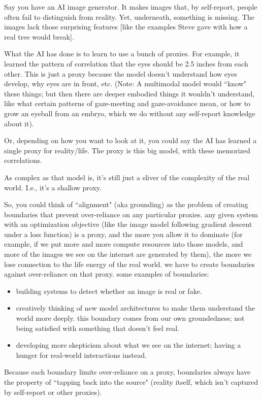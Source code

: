Say you have an AI image generator. It makes images that, by self-report, people often fail to distinguish from reality. Yet, underneath, something is missing. The images lack those surprising features [like the examples Steve gave with how a real tree would break]. 

What the AI has done is to learn to use a bunch of proxies. For example, it learned the pattern of correlation that the eyes should be 2.5 inches from each other. This is just a proxy because the model doesn't understand how eyes develop, why eyes are in front, etc. (Note: A multimodal model would ``know" these things; but then there are deeper embodied things it wouldn't understand, like what certain patterns of gaze-meeting and gaze-avoidance mean, or how to grow an eyeball from an embryo, which we do without any self-report knowledge about it). 

Or, depending on how you want to look at it, you could say the AI has learned a single proxy for reality/life. The proxy is this big model, with these memorized correlations. 

As complex as that model is, it's still just a sliver of the complexity of the real world. I.e., it's a shallow proxy. 

So, you could think of ``alignment" (aka grounding) as the problem of creating boundaries that prevent over-reliance on any particular proxies. any given system with an optimization objective (like the image model following gradient descent under a loss function) is a proxy, and the more you allow it to dominate (for example, if we put more and more compute resources into those models, and more of the images we see on the internet are generated by them), the more we lose connection to the life energy of the real world. we have to create boundaries against over-reliance on that proxy. some examples of boundaries:
\begin{itemize}
\item building systems to detect whether an image is real or fake.
\item creatively thinking of new model architectures to make them understand the world more deeply. this boundary comes from our own groundedness; not being satisfied with something that doesn't feel real.
\item developing more skepticism about what we see on the internet; having a hunger for real-world interactions instead.
\end{itemize}

Because each boundary limits over-reliance on a proxy, boundaries always have the property of ``tapping back into the source" (reality itself, which isn't captured by self-report or other proxies).

